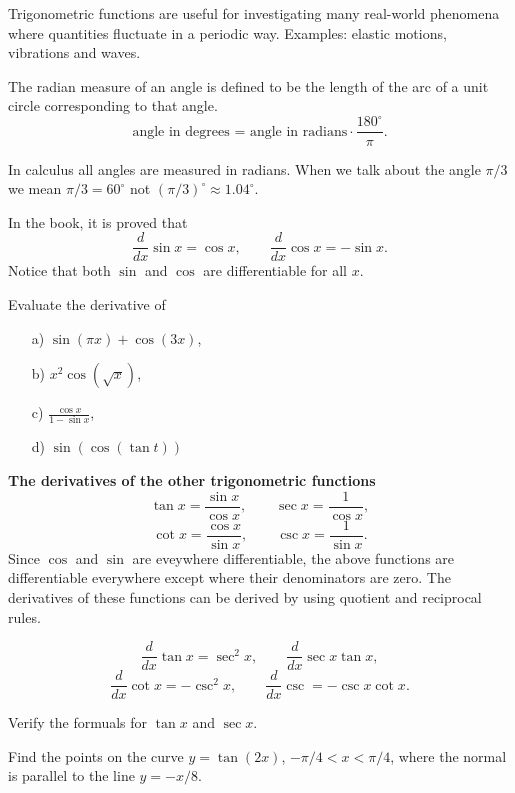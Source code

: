 \documentclass[../main.tex]{subfiles}
\begin{document}
Trigonometric functions are useful for investigating many real-world phenomena where quantities fluctuate in a periodic way. Examples: elastic motions, vibrations and waves.

The radian measure of an angle is defined to be the length of the arc of a unit circle corresponding to that angle.
\[
    \text{angle in degrees = angle in radians}\cdot \frac{180^{\circ}}{\pi}.
\]

In calculus all angles are measured in radians. When we talk about the angle $\pi/3$ we mean $\pi/3 = 60^{\circ}$ not $(\pi/3)^{\circ} \approx 1.04^{\circ}$.

In the book, it is proved that
\[
    \frac{d}{dx} \sin x = \cos x, \qquad \frac{d}{dx} \cos x = -\sin x.
\]
Notice that both $\sin$ and $\cos$ are differentiable for all $x$.
\begin{example}
    Evaluate the derivative of
    \begin{itemize}
        \item[a)] $\sin(\pi x) + \cos(3x)$,
        \item[b)] $x^2 \cos(\sqrt{x})$,
        \item[c)] $\frac{\cos x}{1- \sin x}$,
        \item[d)] $\sin(\cos(\tan t))$
    \end{itemize}
\end{example}

\textbf{The derivatives of the other trigonometric functions}
\[
    \tan x = \frac{\sin x}{\cos x}, \qquad \sec x = \frac{1}{\cos x},
\]
\[
    \cot x = \frac{\cos x}{\sin x}, \qquad \csc x = \frac{1}{\sin x}.
\]
Since $\cos$ and $\sin$ are eveywhere differentiable, the above functions are differentiable everywhere except where their denominators are zero. The derivatives of these functions can be derived by using quotient and reciprocal rules.

\[
    \frac{d}{dx} \tan x= \sec^2 x, \qquad \frac{d}{dx} \sec x \tan x,
\]
\[
    \frac{d}{dx} \cot x = -\csc^2 x, \qquad \frac{d}{dx} \csc = -\csc x \cot x.
\]

\begin{example}
    Verify the formuals for $\tan x$ and $\sec x$.
\end{example}

\begin{example}
    Find the points on the curve $y=\tan(2x)$, $-\pi/4 < x < \pi/4$, where the normal is parallel to the line $y=-x/8$.
\end{example}
\end{document}
